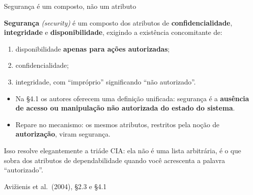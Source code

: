 \documentclass{beamer}
\newcommand{\en}[1]{{\color{depCinza}\textit{#1}}}
\newcommand{\sect}[1]{\par\smallskip\hfill{\tiny\color{black!55}Avi\v{z}ienis et al.\ (2004), #1}}
\begin{document}
\begin{frame}{Seguran\c{c}a \'e um composto, n\~ao um atributo}
    \footnotesize
    \begin{defi}
        \scriptsize
        \textbf{Seguran\c{c}a} \en{(security)} \'e um composto dos atributos de \textbf{confidencialidade}, \textbf{integridade} e \textbf{disponibilidade}, exigindo a exist\^encia concomitante de:
        \begin{enumerate}
            \item disponibilidade \textbf{apenas para a\c{c}\~oes autorizadas};
            \item confidencialidade;
            \item integridade, com ``impr\'oprio'' significando ``n\~ao autorizado''.
        \end{enumerate}
    \end{defi}
    \medskip
    \begin{itemize}
        \item Na \S4.1 os autores oferecem uma defini\c{c}\~ao unificada: seguran\c{c}a \'e a \textbf{aus\^encia de acesso ou manipula\c{c}\~ao n\~ao autorizada do estado do sistema}.
        \item Repare no mecanismo: os mesmos atributos, restritos pela no\c{c}\~ao de \textbf{autoriza\c{c}\~ao}, viram seguran\c{c}a.
    \end{itemize}
    \medskip
    \begin{ancora}
        \footnotesize
        Isso resolve elegantemente a tri\'ade CIA: ela n\~ao \'e uma lista arbitr\'aria, \'e o que sobra dos atributos de dependabilidade quando voc\^e acrescenta a palavra ``autorizado''.
    \end{ancora}
    \sect{\S2.3 e \S4.1}
\end{frame}
\end{document}
